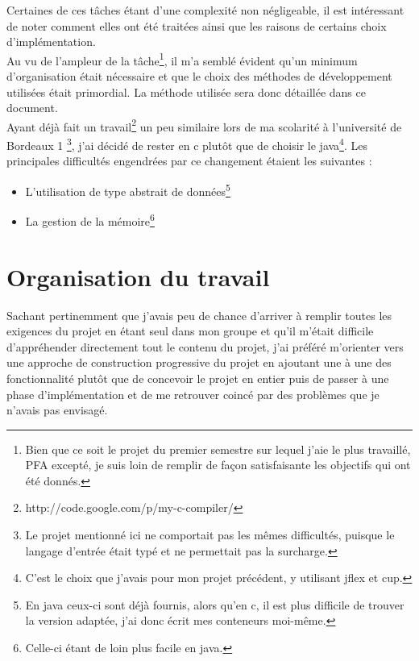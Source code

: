 \documentclass[12pt]{article}
\begin{document}
Certaines de ces tâches étant d'une complexité non négligeable, il est
intéressant de noter comment elles ont été traitées ainsi que les raisons
de certains choix d'implémentation.\\

Au vu de l'ampleur de la tâche\footnote{Bien que ce soit le projet du premier
semestre sur lequel j'aie le plus travaillé, PFA excepté, je suis loin de
remplir de façon satisfaisante les objectifs qui ont été donnés.}, il m'a
semblé évident qu'un minimum d'organisation était nécessaire et que le choix
des méthodes de développement utilisées était primordial. La méthode utilisée
sera donc détaillée dans ce document.\\

Ayant déjà fait un travail\footnote{http://code.google.com/p/my-c-compiler/}
un peu similaire lors de ma scolarité à l'université de Bordeaux 1
\footnote{Le projet mentionné ici ne comportait pas les mêmes difficultés,
puisque le langage d'entrée était typé et ne permettait pas la surcharge.},
j'ai décidé de rester en c plutôt que de choisir le java\footnote{C'est le
choix que j'avais pour mon projet précédent, y utilisant jflex et cup.}. Les
principales difficultés engendrées par ce changement étaient les suivantes :

\begin{itemize}
\item L'utilisation de type abstrait de données\footnote{En java ceux-ci sont
déjà fournis, alors qu'en c, il est plus difficile de trouver la version
adaptée, j'ai donc écrit mes conteneurs moi-même.}
\item La gestion de la mémoire\footnote{Celle-ci étant de loin plus facile en
java.}
\end{itemize}

\section{Organisation du travail}

Sachant pertinemment que j'avais peu de chance d'arriver à remplir toutes les
exigences du projet en étant seul dans mon groupe et qu'il m'était difficile
d'appréhender directement tout le contenu du projet, j'ai préféré m'orienter
vers une approche de construction progressive du projet en ajoutant une à une
des fonctionnalité plutôt que de concevoir le projet en entier puis de passer
à une phase d'implémentation et de me retrouver coincé par des problèmes que
je n'avais pas envisagé.
\end{document}
